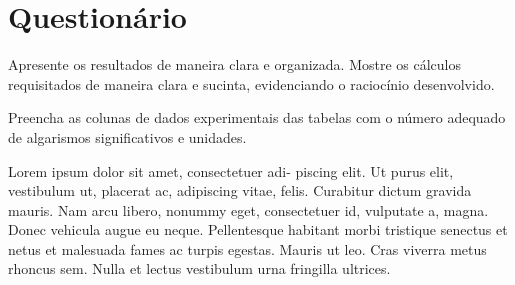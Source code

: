 
\vspace{15mm}

\begin{fullwidth}
\noindent{}
\vspace{5mm}

\noindent{}

\noindent{}

\noindent{}

\noindent{}

\noindent{}
\end{fullwidth}

\vspace{5mm}

\section{Questionário}

\begin{question}[type={exam}]{1}
Apresente os resultados de maneira clara e organizada. Mostre os cálculos requisitados de maneira clara e sucinta, evidenciando o raciocínio desenvolvido.
\end{question}

\begin{question}[type={exam}]{1}
Preencha as colunas de dados experimentais das tabelas com o número adequado de algarismos significativos e unidades.
\end{question}

\begin{question}[type={exam}]{2}
Lorem ipsum dolor sit amet, consectetuer adi-
piscing elit. Ut purus elit, vestibulum ut, placerat ac, adipiscing vitae,
felis. Curabitur dictum gravida mauris. Nam arcu libero, nonummy
eget, consectetuer id, vulputate a, magna. Donec vehicula augue
eu neque. Pellentesque habitant morbi tristique senectus et netus
et malesuada fames ac turpis egestas. Mauris ut leo. Cras viverra
metus rhoncus sem. Nulla et lectus vestibulum urna fringilla ultrices.
\end{question}

